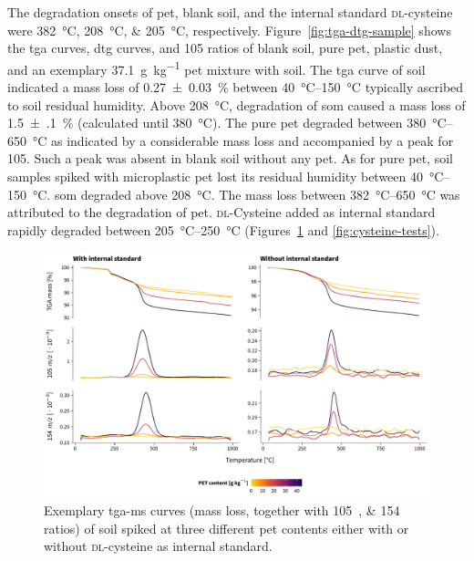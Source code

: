 The degradation onsets of \ac{pet}, blank soil, and the internal standard \textsc{dl}-cysteine were \SIlist{382;208;205}{\degreeCelsius}, respectively. Figure~\ref{fig:tga-dtg-sample} shows the \ac{tga} curves, \acf{dtg} curves, and \SI{105}{\mz} ratios of blank soil, pure \ac{pet}, plastic dust, and an exemplary \SI{37.1}{\gram\per\kilo\gram} \ac{pet} mixture with soil. The \ac{tga} curve of soil indicated a mass loss of \SI{0.27(3)}{\percent} between \SIrange[range-phrase = { and }]{40}{150}{\degreeCelsius} typically ascribed to soil residual humidity.
Above \SI{208}{\degreeCelsius}, degradation of \ac{som} caused a mass loss of \SI{1.5(1)}{\percent} (calculated until \SI{380}{\degreeCelsius}). The pure \ac{pet} degraded between \SIrange[range-phrase = { and }]{380}{650}{\degreeCelsius} as indicated by a considerable mass loss and accompanied by a peak for \SI{105}{\mz}.
Such a peak was absent in blank soil without any \ac{pet}. As for pure \ac{pet}, soil samples spiked with microplastic \ac{pet} lost its residual humidity between \SIrange[range-phrase = { and }]{40}{150}{\degreeCelsius}.
\Ac{som} degraded above \SI{208}{\degreeCelsius}. The mass loss between \SIrange[range-phrase = { and }]{382}{650}{\degreeCelsius} was attributed to the degradation of \ac{pet}. \textsc{dl}-Cysteine added as internal standard rapidly degraded between \SIrange[range-phrase = { and }]{205}{250}{\degreeCelsius} (Figures~\ref{fig:tga-ms} and \ref{fig:cysteine-tests}).

\begin{figure}
	\includegraphics[width=\textwidth]{figures/tga-ms}
	\caption[Exemplary \ac{tga-ms} curves of soil spiked at three different \ac{pet} contents with or without internal standard.]{Exemplary \ac{tga-ms} curves (mass loss, together with \SIlist{105;154}{\mz} ratios) of soil spiked at three different \ac{pet} contents either with or without \textsc{dl}-cysteine as internal standard.}
	\label{fig:tga-ms}
	\forcerectofloat
\end{figure}

